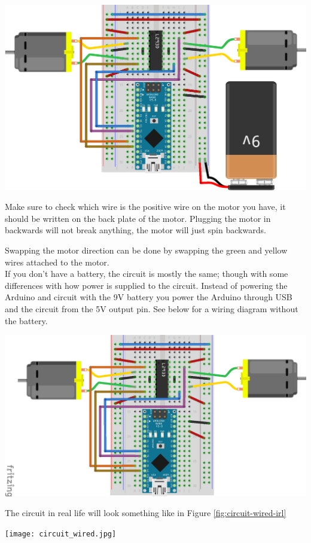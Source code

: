 \documentclass[../TinyBot.tex]{subfiles}
\begin{document}
\begin{center}
    \includegraphics[width=\textwidth]{resources/H-bridge-nano_bb.png}
    \label{fig:schematic-hbridge-battery}
\end{center}

Make sure to check which wire is the positive wire on the motor you have, it should be written on the back plate of the motor. Plugging the motor in backwards will not break anything, the motor will just spin backwards. 

Swapping the motor direction can be done by swapping the green and yellow wires attached to the motor. 
\\

If you don't have a battery, the circuit is mostly the same; though with some differences with how power is supplied to the circuit. Instead of powering the Arduino and circuit with the 9V battery you power the Arduino through USB and the circuit from the 5V output pin. See below for a wiring diagram without the battery.


\begin{center}
    \includegraphics[width=\textwidth]{resources/H-bridge-nano-without-battery_bb.png}
    \label{fig:schematic-hbridge-nobattery}
\end{center}


The circuit in real life will look something like in Figure \ref{fig:circuit-wired-irl}

\begin{center}
    \texttt{[image: circuit\_wired.jpg]}
    \label{fig:circuit-wired-irl}
\end{center}
\end{document}
